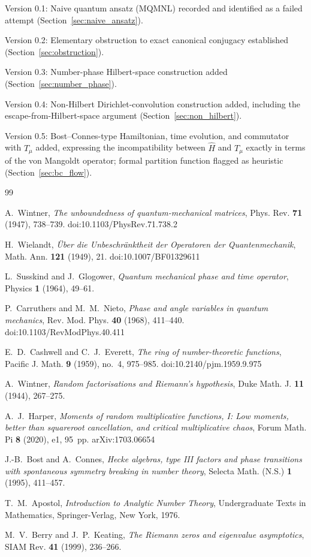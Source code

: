 \documentclass[11pt]{amsart}
\numberwithin{equation}{section}
\theoremstyle{plain}
\theoremstyle{definition}
\theoremstyle{remark}
\begin{document}
\noindent Version 0.1: Naive quantum ansatz (MQMNL) recorded and
identified as a failed attempt (Section~\ref{sec:naive_ansatz}).

\noindent Version 0.2: Elementary obstruction to exact canonical
conjugacy established (Section~\ref{sec:obstruction}).

\noindent Version 0.3: Number-phase Hilbert-space construction added
(Section~\ref{sec:number_phase}).

\noindent Version 0.4: Non-Hilbert Dirichlet-convolution construction
added, including the escape-from-Hilbert-space argument
(Section~\ref{sec:non_hilbert}).

\noindent Version 0.5: Bost--Connes-type Hamiltonian, time evolution,
and commutator with $T_\mu$ added, expressing the incompatibility
between $\hat H$ and $T_\mu$ exactly in terms of the von Mangoldt
operator; formal partition function flagged as heuristic
(Section~\ref{sec:bc_flow}).

\begin{thebibliography}{99}

A.~Wintner, \emph{The unboundedness of quantum-mechanical matrices},
Phys. Rev. \textbf{71} (1947), 738--739.
doi:10.1103/PhysRev.71.738.2

H.~Wielandt, \emph{\"Uber die Unbeschr\"anktheit der Operatoren der
Quantenmechanik}, Math. Ann. \textbf{121} (1949), 21.
doi:10.1007/BF01329611

L.~Susskind and J.~Glogower, \emph{Quantum mechanical phase and time
operator}, Physics \textbf{1} (1964), 49--61.

P.~Carruthers and M.~M.~Nieto, \emph{Phase and angle variables in
quantum mechanics}, Rev. Mod. Phys. \textbf{40} (1968), 411--440.
doi:10.1103/RevModPhys.40.411

E.~D.~Cashwell and C.~J.~Everett, \emph{The ring of number-theoretic
functions}, Pacific J. Math. \textbf{9} (1959), no.~4, 975--985.
doi:10.2140/pjm.1959.9.975

A.~Wintner, \emph{Random factorisations and Riemann's hypothesis},
Duke Math. J. \textbf{11} (1944), 267--275.

A.~J.~Harper, \emph{Moments of random multiplicative functions, I: Low
moments, better than squareroot cancellation, and critical
multiplicative chaos}, Forum Math. Pi \textbf{8} (2020), e1, 95~pp.
arXiv:1703.06654

J.-B.~Bost and A.~Connes, \emph{Hecke algebras, type III factors and
phase transitions with spontaneous symmetry breaking in number
theory}, Selecta Math. (N.S.) \textbf{1} (1995), 411--457.

T.~M.~Apostol, \emph{Introduction to Analytic Number Theory},
Undergraduate Texts in Mathematics, Springer-Verlag, New York, 1976.

M.~V.~Berry and J.~P.~Keating, \emph{The Riemann zeros and eigenvalue
asymptotics}, SIAM Rev. \textbf{41} (1999), 236--266.

\end{thebibliography}
\end{document}
